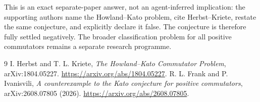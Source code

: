 \documentclass[11pt]{article}
\begin{document}
This is an exact separate-paper answer, not an agent-inferred implication:
the supporting authors name the Howland--Kato problem, cite Herbst--Kriete,
restate the same conjecture, and explicitly declare it false.  The conjecture
is therefore fully settled negatively.  The broader classification problem
for all positive commutators remains a separate research programme.

\begin{thebibliography}{9}
I. Herbst and T. L. Kriete,
\emph{The Howland--Kato Commutator Problem}, arXiv:1804.05227.
\url{https://arxiv.org/abs/1804.05227}.
R. L. Frank and P. Ivanisvili,
\emph{A counterexample to the Kato conjecture for positive commutators},
arXiv:2608.07805 (2026).
\url{https://arxiv.org/abs/2608.07805}.
\end{thebibliography}
\end{document}
